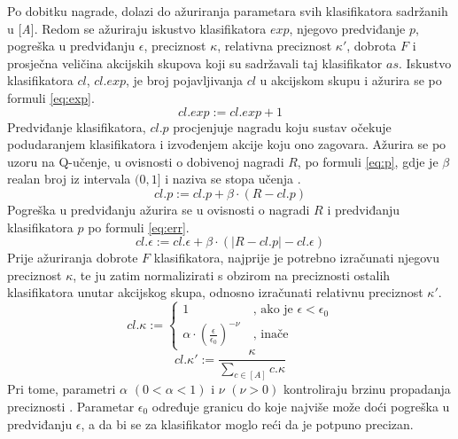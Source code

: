 \documentclass[times, utf8, zavrsni]{fer}
\begin{document}
Po dobitku nagrade, dolazi do ažuriranja parametara svih klasifikatora sadržanih u [\emph{A}].
Redom se ažuriraju iskustvo klasifikatora  $exp$, njegovo predviđanje  $p$, pogreška u predviđanju  $\epsilon$, preciznost  $\kappa$, relativna preciznost  $\kappa'$, dobrota $F$ i prosječna veličina akcijskih skupova koji su sadržavali taj klasifikator  $as$.
Iskustvo klasifikatora $cl$, $cl.exp$, je broj pojavljivanja $cl$ u akcijskom skupu i ažurira se po formuli \eqref{eq:exp}.
\begin{equation}
    \label{eq:exp}
    cl.exp := cl.exp + 1
\end{equation}
Predviđanje klasifikatora, $cl.p$ procjenjuje nagradu koju sustav očekuje podudaranjem klasifikatora i izvođenjem akcije koju ono zagovara.
Ažurira se po uzoru na Q-učenje, u ovisnosti o dobivenoj nagradi $R$, po formuli \eqref{eq:p}, gdje je $\beta$ realan broj iz intervala $(0, 1]$ i naziva se stopa učenja .
\begin{equation}
    \label{eq:p}
    cl.p := cl.p + \beta \cdot (R - cl.p)
\end{equation}
Pogreška u predviđanju ažurira se u ovisnosti o nagradi $R$ i predviđanju klasifikatora $p$ po formuli \eqref{eq:err}.
\begin{equation}
    \label{eq:err}
    cl.\epsilon := cl.\epsilon + \beta \cdot (|R - cl.p| - cl.\epsilon)
\end{equation}
Prije ažuriranja dobrote $F$ klasifikatora, najprije je potrebno izračunati njegovu preciznost $\kappa$, te ju zatim normalizirati s obzirom na preciznosti ostalih klasifikatora unutar akcijskog skupa, odnosno izračunati relativnu preciznost $\kappa'$.
\begin{equation}
    \label{eq:acc}
    cl.\kappa :=
    \begin{cases}
        1 &\ \mbox{, ako je } \epsilon < \epsilon_{0} \\
        \alpha \cdot \left( \frac{\epsilon}{\epsilon_{0}} \right)^{-\nu} &\ \mbox{, inače}
    \end{cases}
\end{equation}
\begin{equation}
    \label{eq:racc}
    cl.\kappa' := \frac{\kappa}{\sum_{c \in [A]} c.\kappa}
\end{equation}
Pri tome, parametri $\alpha$ $(0 < \alpha < 1)$ i $\nu$ $(\nu > 0)$ kontroliraju brzinu propadanja preciznosti \citep{5}.
Parametar $\epsilon_{0}$ određuje granicu do koje najviše može doći pogreška u predviđanju $\epsilon$, a da bi se za klasifikator moglo reći da je potpuno precizan.
\end{document}
